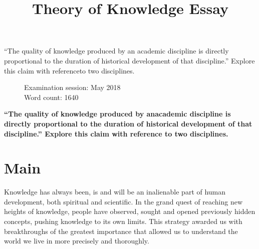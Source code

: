\documentclass[12pt,a4paper]{article}
\title{Theory of Knowledge Essay}
\author{}
\date{}
\begin{document}

\maketitle

\doublespacing

\begin{center}

  ``The quality of knowledge produced by an academic discipline is directly proportional to the duration of historical development of that discipline.'' Explore this claim with referenceto two disciplines.

\end{center}

\begin{figure}[b]
  \begin{flushleft}
    Examination session: May 2018\\
    Word count: 1640\\
    \end{flushleft}
  \end{figure}

\newpage
{}
\begin{center}
    \textbf{``The quality of knowledge produced by anacademic discipline is directly proportional to the duration of historical development of that discipline.'' Explore this claim with reference to two disciplines.}
\end{center}

\section{Main}

Knowledge has always been, is and will be an inalienable part of human development, both spiritual and scientific. In the grand quest of reaching new heights of knowledge, people have observed, sought and opened previously hidden concepts, pushing knowledge to its own limits. This strategy awarded us with breakthroughs of the greatest importance that allowed us to understand the world we live in more precisely and thoroughly. \\
\end{document}
